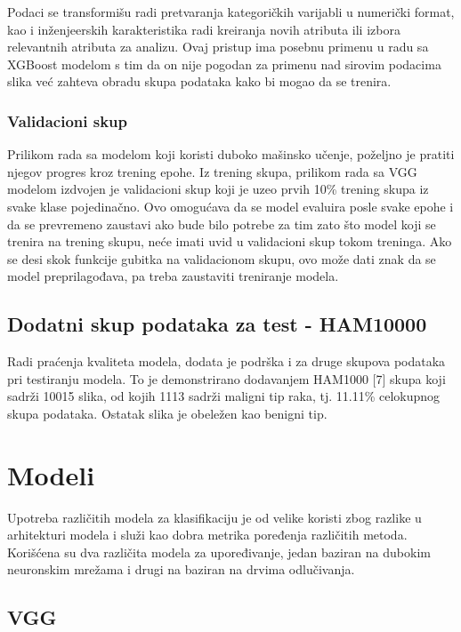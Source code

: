 \documentclass{article}
\begin{document}
\par
Podaci se transformišu radi pretvaranja kategoričkih varijabli u numerički format, kao i inženjeerskih karakteristika radi kreiranja novih atributa ili izbora relevantnih atributa za analizu. Ovaj pristup ima posebnu primenu u radu sa XGBoost modelom s tim da on nije pogodan za primenu nad sirovim podacima slika već zahteva obradu skupa podataka kako bi mogao da se trenira.

\subsubsection{Validacioni skup}

Prilikom rada sa modelom koji koristi duboko mašinsko učenje, poželjno je pratiti njegov progres kroz trening epohe. Iz trening skupa, prilikom rada sa VGG modelom izdvojen je validacioni skup koji je uzeo prvih 10\% trening skupa iz svake klase pojedinačno. Ovo omogućava da se model evaluira posle svake epohe i da se prevremeno zaustavi ako bude bilo potrebe za tim zato što model koji se trenira na trening skupu, neće imati uvid u validacioni skup tokom treninga. Ako se desi skok funkcije gubitka na validacionom skupu, ovo može dati znak da se model preprilagođava, pa treba zaustaviti treniranje modela.

\subsection{Dodatni skup podataka za test - HAM10000}

Radi praćenja kvaliteta modela, dodata je podrška i za druge skupova podataka pri testiranju modela. To je demonstrirano dodavanjem HAM1000 [7] skupa koji sadrži 10015 slika, od kojih 1113 sadrži maligni tip raka, tj. 11.11\% celokupnog skupa podataka. Ostatak slika je obeležen kao benigni tip.

\section{Modeli}

Upotreba različitih modela za klasifikaciju je od velike koristi zbog razlike u arhitekturi modela i služi kao dobra metrika poređenja različitih metoda. Korišćena su dva različita modela za upoređivanje, jedan baziran na dubokim neuronskim mrežama i drugi na baziran na drvima odlučivanja.

\subsection{VGG}
\end{document}
